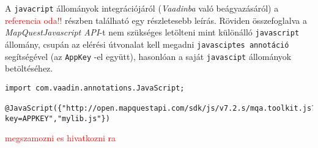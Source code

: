 \par A {\tt javacript} állományok  integrációjáról (\textit{Vaadinba} való beágyazásáról) a \textcolor{red}{referencia oda!!} részben található egy részletesebb leírás.  Röviden összefoglalva a  \textit{MapQuestJavascript API}-t nem szükséges letölteni mint különálló {\tt javascript} állomány, csupán az elérési útvonalat kell megadni  {\tt javasciptes annotáció } segítségével (az {\tt AppKey} -el együtt), hasonlóan a saját {\tt javascipt} állományok betöltéséhez. 
\lstset{language=Java}
\begin{lstlisting}
import com.vaadin.annotations.JavaScript;

@JavaScript({"http://open.mapquestapi.com/sdk/js/v7.2.s/mqa.toolkit.js?key=APPKEY","mylib.js"})

\end{lstlisting}
\textcolor{red}{ megszamozni es hivatkozni ra}

